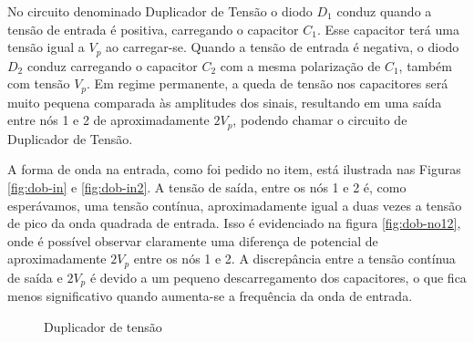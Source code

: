 \documentclass[a4paper]{article} %
\begin{document}
No circuito denominado Duplicador de Tensão o diodo $D_1$ conduz quando a tensão de entrada é positiva, carregando o capacitor $C_1$. Esse capacitor terá uma tensão igual a $V_p$ ao carregar-se. Quando a tensão de entrada é negativa, o diodo $D_2$ conduz carregando o capacitor $C_2$ com a mesma polarização de $C_1$, também com tensão $V_p$. Em regime permanente, a queda de tensão nos capacitores será muito pequena comparada às amplitudes dos sinais, resultando em uma saída entre nós 1 e 2 de aproximadamente $2V_p$, podendo chamar o circuito de Duplicador de Tensão.

A forma de onda na entrada, como foi pedido no item, está ilustrada nas Figuras \ref{fig:dob-in} e \ref{fig:dob-in2}. A tensão de saída, entre os nós 1 e 2 é, como esperávamos, uma tensão contínua, aproximadamente igual a duas vezes a tensão de pico da onda quadrada de entrada. Isso é evidenciado na figura \ref{fig:dob-no12}, onde é possível observar claramente uma diferença de potencial de aproximadamente $2V_p$ entre os nós 1 e 2. A discrepância entre a tensão contínua de saída e $2V_p$ é devido a um pequeno descarregamento dos capacitores, o que fica menos significativo quando aumenta-se a frequência da onda de entrada.



 \setcounter{figure}{0}
\vspace{3mm}
\begin{figure}[h]
\centerline{}
\caption{Duplicador de tensão \label{tab:circ}}
\end{figure}
\end{document}
